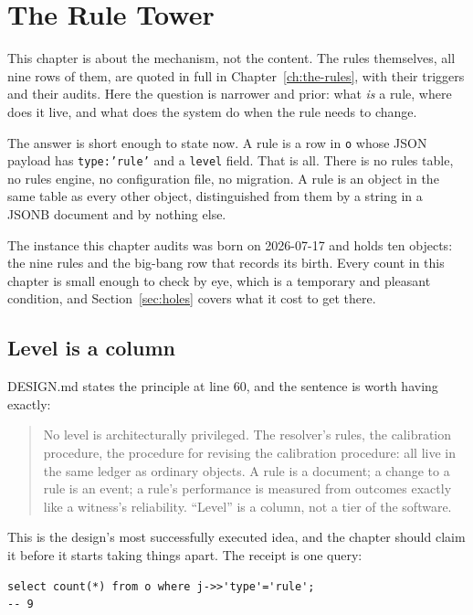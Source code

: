 \chapter{The Rule Tower}

This chapter is about the mechanism, not the content. The rules themselves, all nine rows of them, are quoted in full in Chapter~\ref{ch:the-rules}, with their triggers and their audits. Here the question is narrower and prior: what \emph{is} a rule, where does it live, and what does the system do when the rule needs to change.

The answer is short enough to state now. A rule is a row in \texttt{o} whose JSON payload has \texttt{type:'rule'} and a \texttt{level} field. That is all. There is no rules table, no rules engine, no configuration file, no migration. A rule is an object in the same table as every other object, distinguished from them by a string in a JSONB document and by nothing else.

The instance this chapter audits was born on 2026-07-17 and holds ten objects: the nine rules and the big-bang row that records its birth. Every count in this chapter is small enough to check by eye, which is a temporary and pleasant condition, and Section~\ref{sec:holes} covers what it cost to get there.

\section{Level is a column}

DESIGN.md states the principle at line 60, and the sentence is worth having exactly:

\begin{quote}
No level is architecturally privileged. The resolver's rules, the calibration procedure, the procedure for revising the calibration procedure: all live in the same ledger as ordinary objects. A rule is a document; a change to a rule is an event; a rule's performance is measured from outcomes exactly like a witness's reliability. ``Level'' is a column, not a tier of the software.
\end{quote}

This is the design's most successfully executed idea, and the chapter should claim it before it starts taking things apart. The receipt is one query:

\begin{verbatim}
select count(*) from o where j->>'type'='rule';
-- 9
\end{verbatim}

